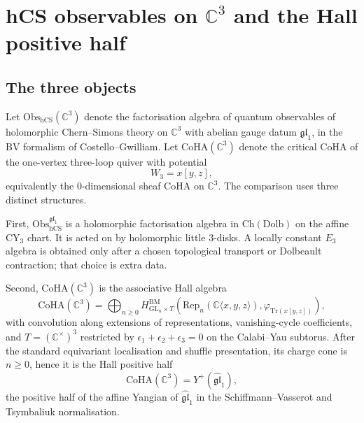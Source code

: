 
\providecommand{\Obs}{\mathrm{Obs}}
\providecommand{\hCS}{\mathrm{hCS}}
\providecommand{\Dolb}{\mathrm{Dolb}}
\providecommand{\CoHA}{\mathrm{CoHA}}
\providecommand{\Hilb}{\mathrm{Hilb}}
\providecommand{\Rep}{\mathrm{Rep}}
\providecommand{\glhat}{\widehat{\mathfrak{gl}}}
\providecommand{\CE}{\mathrm{CE}}
\providecommand{\BM}{\mathrm{BM}}
\providecommand{\kch}{\kappa_{\mathrm{ch}}}
\providecommand{\kcat}{\kappa_{\mathrm{cat}}}
\providecommand{\kBKM}{\kappa_{\mathrm{BKM}}}
\providecommand{\Hom}{\operatorname{Hom}}
\providecommand{\C}{\mathbb{C}}
\providecommand{\Ypos}{Y^{+}}

\section*{hCS observables on $\C^3$ and the Hall positive half}

\subsection*{The three objects}

Let $\Obs_{\hCS}(\C^3)$ denote the factorisation algebra of quantum
observables of holomorphic Chern--Simons theory on $\C^3$ with abelian
gauge datum $\mathfrak{gl}_1$, in the BV formalism of
Costello--Gwilliam. Let $\CoHA(\C^3)$ denote the critical CoHA of the
one-vertex three-loop quiver with potential
\[
  W_3=x[y,z],
\]
equivalently the $0$-dimensional sheaf CoHA on $\C^3$. The comparison
uses three distinct structures.

First, $\Obs_{\hCS}^{\mathfrak{gl}_1}$ is a holomorphic factorisation
algebra in $\mathrm{Ch}(\Dolb)$ on the affine CY$_3$ chart. It is acted
on by holomorphic little $3$-disks. A locally constant $E_3$ algebra is
obtained only after a chosen topological transport or Dolbeault
contraction; that choice is extra data.

Second, $\CoHA(\C^3)$ is the associative Hall algebra
\[
  \CoHA(\C^3)
  =
  \bigoplus_{n\geq 0}
  H^{\BM}_{\mathrm{GL}_n\times T}\!\left(
    \Rep_n(\C\langle x,y,z\rangle),
    \varphi_{\mathrm{Tr}(x[y,z])}
  \right),
\]
with convolution along extensions of representations, vanishing-cycle
coefficients, and $T=(\C^\times)^3$ restricted by
$\epsilon_1+\epsilon_2+\epsilon_3=0$ on the Calabi--Yau subtorus. After
the standard equivariant localisation and shuffle presentation, its
charge cone is $n\geq0$, hence it is the Hall positive half
\[
  \CoHA(\C^3)=\Ypos(\glhat_1),
\]
the positive half of the affine Yangian of $\glhat_1$ in the
Schiffmann--Vasserot and Tsymbaliuk normalisation.

